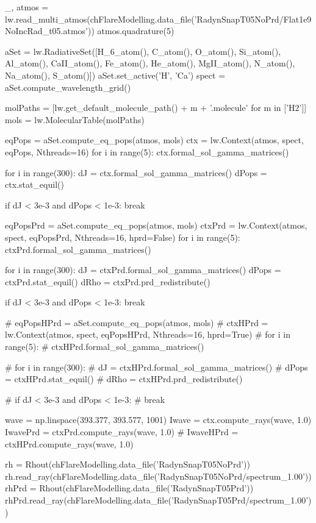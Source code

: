 \begin{pycode}[FlareModelling]

_, atmos = lw.read_multi_atmos(chFlareModelling.data_file('RadynSnapT05NoPrd/Flat1e9NoIncRad_t05.atmos'))
atmos.quadrature(5)

aSet = lw.RadiativeSet([H_6_atom(), C_atom(), O_atom(), Si_atom(), Al_atom(),
                        CaII_atom(), Fe_atom(), He_atom(), MgII_atom(), N_atom(),
                        Na_atom(), S_atom()])
aSet.set_active('H', 'Ca')
spect = aSet.compute_wavelength_grid()

molPaths = [lw.get_default_molecule_path() + m + '.molecule' for m in ['H2']]
mols = lw.MolecularTable(molPaths)

eqPops = aSet.compute_eq_pops(atmos, mols)
ctx = lw.Context(atmos, spect, eqPops, Nthreads=16)
for i in range(5):
    ctx.formal_sol_gamma_matrices()

for i in range(300):
    dJ = ctx.formal_sol_gamma_matrices()
    dPops = ctx.stat_equil()

    if dJ < 3e-3 and dPops < 1e-3:
        break

eqPopsPrd = aSet.compute_eq_pops(atmos, mols)
ctxPrd = lw.Context(atmos, spect, eqPopsPrd, Nthreads=16, hprd=False)
for i in range(5):
    ctxPrd.formal_sol_gamma_matrices()

for i in range(300):
    dJ = ctxPrd.formal_sol_gamma_matrices()
    dPops = ctxPrd.stat_equil()
    dRho = ctxPrd.prd_redistribute()

    if dJ < 3e-3 and dPops < 1e-3:
        break

# eqPopsHPrd = aSet.compute_eq_pops(atmos, mols)
# ctxHPrd = lw.Context(atmos, spect, eqPopsHPrd, Nthreads=16, hprd=True)
# for i in range(5):
#     ctxHPrd.formal_sol_gamma_matrices()

# for i in range(300):
#     dJ = ctxHPrd.formal_sol_gamma_matrices()
#     dPops = ctxHPrd.stat_equil()
#     dRho = ctxHPrd.prd_redistribute()

#     if dJ < 3e-3 and dPops < 1e-3:
#         break

wave = np.linspace(393.377, 393.577, 1001)
Iwave = ctx.compute_rays(wave, 1.0)
IwavePrd = ctxPrd.compute_rays(wave, 1.0)
# IwaveHPrd = ctxHPrd.compute_rays(wave, 1.0)

rh = Rhout(chFlareModelling.data_file('RadynSnapT05NoPrd'))
rh.read_ray(chFlareModelling.data_file('RadynSnapT05NoPrd/spectrum_1.00'))
rhPrd = Rhout(chFlareModelling.data_file('RadynSnapT05Prd'))
rhPrd.read_ray(chFlareModelling.data_file('RadynSnapT05Prd/spectrum_1.00'))


\end{pycode}
